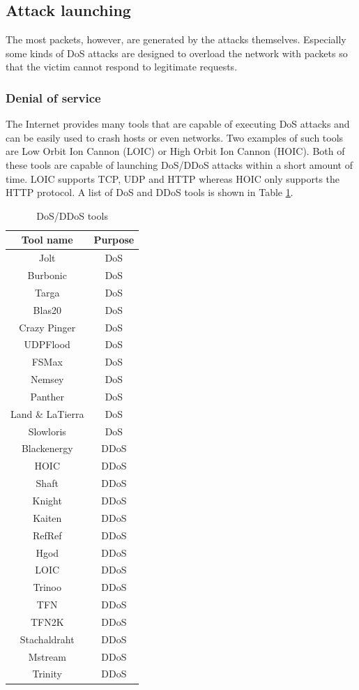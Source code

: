 \documentclass[conference]{IEEEtran}
\begin{document}
\subsection{Attack launching}
The most packets, however, are generated by the attacks themselves.
Especially some kinds of DoS attacks are designed to overload the network with packets so that the victim cannot respond to legitimate requests. 

\subsubsection{Denial of service}
The Internet provides many tools that are capable of executing DoS attacks and can be easily used to crash hosts or even networks.
Two examples of such tools are Low Orbit Ion Cannon (LOIC) or High Orbit Ion Cannon (HOIC). Both of these tools are capable of launching DoS/DDoS attacks within a short amount of time.
LOIC supports TCP, UDP and HTTP whereas HOIC only supports the HTTP protocol\cite{b1}. A list of DoS and DDoS tools is shown in Table \ref{table:ddos-tools}.

\begin{table}[htbp]
\caption{DoS/DDoS tools \cite{b1}} 
\centering
\begin{tabular}{ | c | c | }
\hline
Tool name & Purpose \\
\hline
Jolt & DoS \\
Burbonic & DoS \\
Targa & DoS \\
Blas20 & DoS \\
Crazy Pinger & DoS \\
UDPFlood & DoS \\
FSMax & DoS \\
Nemsey & DoS \\
Panther & DoS \\
Land \& LaTierra & DoS \\
Slowloris & DoS \\
Blackenergy & DDoS \\
HOIC & DDoS \\
Shaft & DDoS \\
Knight & DDoS \\
Kaiten & DDoS \\
RefRef & DDoS \\
Hgod & DDoS \\
LOIC & DDoS \\
Trinoo & DDoS \\
TFN & DDoS \\
TFN2K & DDoS \\
Stachaldraht & DDoS \\
Mstream & DDoS \\
Trinity & DDoS \\
\hline
\end{tabular}
\label{table:ddos-tools}
\end{table}
\end{document}
